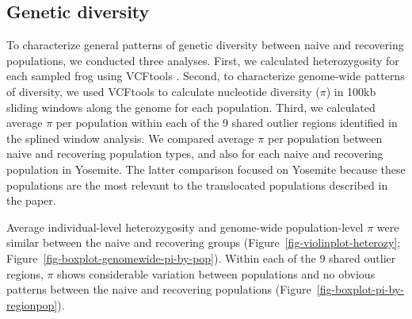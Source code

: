 \documentclass[9pt,twoside,lineno]{pnas-new-SI}
\begin{document}
\hypertarget{genetic-diversity}{%
\subsection{Genetic diversity}\label{genetic-diversity}}

To characterize general patterns of genetic diversity between naive and
recovering populations, we conducted three analyses. First, we
calculated heterozygosity for each sampled frog using VCFtools
\citep{danecek2011}. Second, to characterize genome-wide patterns of
diversity, we used VCFtools to calculate nucleotide diversity (\(\pi\))
in 100kb sliding windows along the genome for each population. Third, we
calculated average \(\pi\) per population within each of the 9 shared
outlier regions identified in the splined window analysis. We compared
average \(\pi\) per population between naive and recovering population
types, and also for each naive and recovering population in Yosemite.
The latter comparison focused on Yosemite because these populations are
the most relevant to the translocated populations described in the
paper.

Average individual-level heterozygosity and genome-wide population-level
\(\pi\) were similar between the naive and recovering groups
(Figure~\ref{fig-violinplot-heterozy};
Figure~\ref{fig-boxplot-genomewide-pi-by-pop}). Within each of the 9
shared outlier regions, \(\pi\) shows considerable variation between
populations and no obvious patterns between the naive and recovering
populations (Figure~\ref{fig-boxplot-pi-by-regionpop}).

\newpage

\newpage
\end{document}
